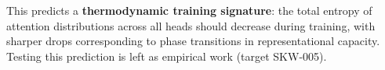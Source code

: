 This predicts a \textbf{thermodynamic training signature}: the total entropy of attention distributions across all heads should decrease during training, with sharper drops corresponding to phase transitions in representational capacity. Testing this prediction is left as empirical work (target SKW-005).


















































































